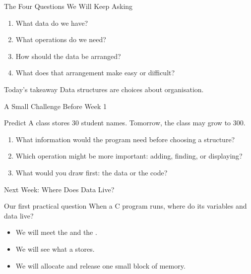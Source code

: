 \documentclass[aspectratio=169]{beamer}
\begin{document}
\begin{frame}{The Four Questions We Will Keep Asking}
  \begin{enumerate}
    \item What data do we have?
    \item What operations do we need?
    \item How should the data be arranged?
    \item What does that arrangement make easy or difficult?
  \end{enumerate}
  \vspace{0.2cm}
  \begin{exampleblock}{Today's takeaway}
    Data structures are choices about organisation.
  \end{exampleblock}
\end{frame}

\begin{frame}{A Small Challenge Before Week 1}
  \begin{block}{Predict}
    A class stores 30 student names. Tomorrow, the class may grow to 300.
  \end{block}
  \begin{enumerate}
    \item What information would the program need before choosing a structure?
    \item Which operation might be more important: adding, finding, or displaying?
    \item What would you draw first: the data or the code?
  \end{enumerate}
\end{frame}

\begin{frame}{Next Week: Where Does Data Live?}
  \begin{block}{Our first practical question}
    When a C program runs, where do its variables and data live?
  \end{block}
  \begin{itemize}
    \item We will meet the  and the .
    \item We will see what a  stores.
    \item We will allocate and release one small block of memory.
  \end{itemize}
\end{frame}
\end{document}
